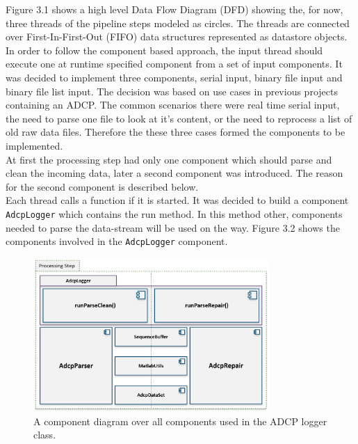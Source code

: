 Figure 3.1 shows a high level Data Flow Diagram (DFD) showing the, for now, three threads of the pipeline steps modeled as circles. The threads are connected over First-In-First-Out (FIFO) data structures represented as datastore objects. In order to follow the component based approach, the input thread should execute one at runtime specified component from a set of input components. It was decided to implement three components, serial input, binary file input and binary file list input. The decision was based on use cases in previous projects containing an ADCP. The common scenarios there were real time serial input, the need to parse one file to look at it's content, or the need to reprocess a list of old raw data files. Therefore the these three cases formed the components to be implemented.\\ 
At first the processing step had only one component which should parse and clean the incoming data, later a second component was introduced. The reason for the second component is described below.\\
Each thread calls a function if it is started. It was decided to build a component \texttt{AdcpLogger} which contains the run method. In this method other, components needed to parse the data-stream will be used on the way. Figure 3.2 shows the components involved in the \texttt{AdcpLogger} component. 
\begin{figure}[h]
\centering
      \includegraphics[width=0.8\textwidth]{components}
        \caption{A component diagram over all components used in the ADCP logger class.} 
\end{figure}
